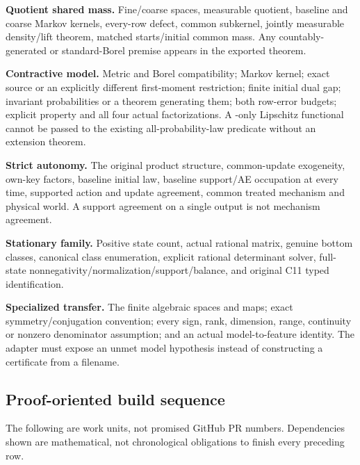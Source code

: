 \documentclass[
  11pt,
  a4paper,
]{article}
\newcommand{\codewrap}[1]{{\ttfamily\seqsplit{#1}}}
\begin{document}
\textbf{Quotient shared mass.} Fine/coarse spaces, measurable quotient,
baseline and coarse Markov kernels, every-row defect, common subkernel,
jointly measurable density/lift theorem, matched starts/initial common
mass. Any countably-generated or standard-Borel premise appears in the
exported theorem.

\textbf{Contractive model.} Metric and Borel compatibility; Markov
kernel; exact source \codewrap{IsW1Contraction} or an explicitly different
first-moment restriction; finite initial dual gap; invariant
probabilities or a theorem generating them; both row-error budgets;
explicit property and all four actual factorizations. A \codewrap{P1}-only
Lipschitz functional cannot be passed to the existing
all-probability-law predicate without an extension theorem.

\textbf{Strict autonomy.} The original \codewrap{TwoPlayerGenerator}
product structure, common-update exogeneity, own-key factors, baseline
initial law, baseline support/AE occupation at every time, supported
action and update agreement, common treated mechanism and physical
world. A support agreement on a single output is not mechanism
agreement.

\textbf{Stationary family.} Positive state count, actual rational
matrix, genuine bottom classes, canonical class enumeration, explicit
rational determinant solver, full-state
nonnegativity/normalization/support/balance, and original C11 typed
identification.

\textbf{Specialized transfer.} The finite algebraic spaces and maps;
exact symmetry/conjugation convention; every sign, rank, dimension,
range, continuity or nonzero denominator assumption; and an actual
model-to-feature identity. The adapter must expose an unmet model
hypothesis instead of constructing a certificate from a filename.

\subsection{Proof-oriented build
sequence}\label{proof-oriented-build-sequence}

The following are work units, not promised GitHub PR numbers.
Dependencies shown are mathematical, not chronological obligations to
finish every preceding row.
\end{document}
